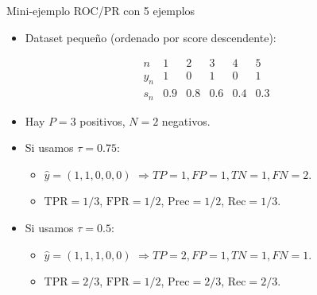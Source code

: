 \begin{frame}{Mini-ejemplo ROC/PR con 5 ejemplos}
\small
\begin{itemize}
  \item Dataset pequeño (ordenado por score descendente):
\end{itemize}
\vspace{-0.3em}
\[
\begin{array}{c|ccccc}
  n          & 1 & 2 & 3 & 4 & 5 \\\hline
  y_n        & 1 & 0 & 1 & 0 & 1 \\
  s_n        & 0.9 & 0.8 & 0.6 & 0.4 & 0.3
\end{array}
\]
\vspace{-0.4em}
\begin{itemize}\small
  \item Hay \(P=3\) positivos, \(N=2\) negativos.
  \item Si usamos \(\tau=0.75\):
  \begin{itemize}
    \item \(\hat{y}=(1,1,0,0,0)\) \(\Rightarrow TP=1, FP=1, TN=1, FN=2\).
    \item \(\mathrm{TPR}=1/3\), \(\mathrm{FPR}=1/2\), \(\mathrm{Prec}=1/2\), \(\mathrm{Rec}=1/3\).
  \end{itemize}
  \item Si usamos \(\tau=0.5\):
  \begin{itemize}
    \item \(\hat{y}=(1,1,1,0,0)\) \(\Rightarrow TP=2, FP=1, TN=1, FN=1\).
    \item \(\mathrm{TPR}=2/3\), \(\mathrm{FPR}=1/2\), \(\mathrm{Prec}=2/3\), \(\mathrm{Rec}=2/3\).
  \end{itemize}
\end{itemize}
\end{frame}

